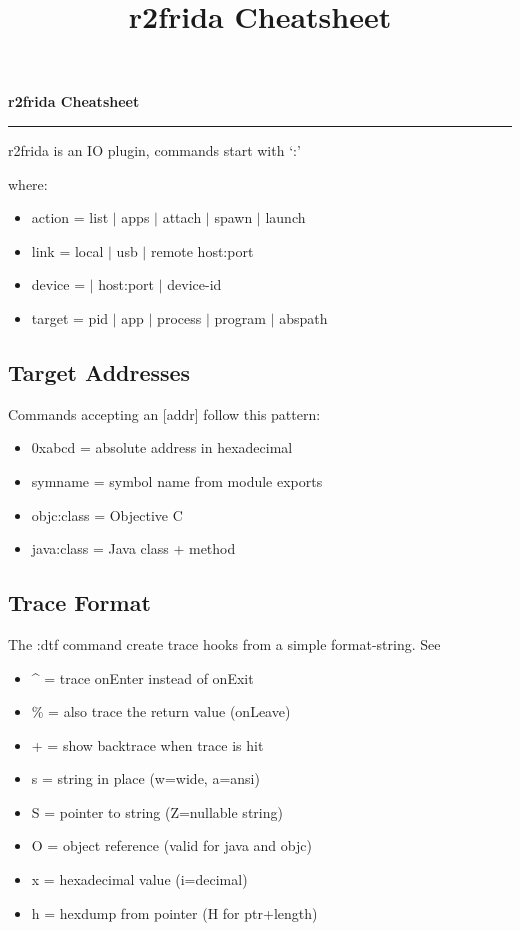 \documentclass[10pt]{article}
\title{r2frida Cheatsheet}
\begin{document}
\pagestyle{r2fancy}

\begin{center}
	\Large{\bf r2frida Cheatsheet}
	\rule{\textwidth}{0.2pt}
\end{center}

\begin{multicols}{3}
\noindent
r2frida is an IO plugin, commands start with `{\ttc:}'
\begin{center}
\end{center}
where:
\begin{itemize}
	\itemsep 0em %
	\item action = list $\vert$ apps $\vert$ attach $\vert$ spawn $\vert$ launch
	\item link   = local $\vert$ usb $\vert$ remote host:port
	\item device = {\tt \textquotesingle \textquotesingle} $\vert$ host:port $\vert$ device-id
	\item target = pid $\vert$ app $\vert$ process $\vert$ program $\vert$ abspath
\end{itemize}

\subsection*{Target Addresses}
\noindent
Commands accepting an [addr] follow this pattern:
\begin{itemize}
	\itemsep 0em %
	\item 0xabcd = absolute address in hexadecimal
	\item symname = symbol name from module exports
	\item objc:class = Objective C
	\item java:class = Java class + method
\end{itemize}

\subsection*{Trace Format}
\noindent
The :dtf command create trace hooks from a simple format-string. See 
\begin{itemize}
	\itemsep 0em %
	\item \^{} = trace onEnter instead of onExit
	\item \%{} = also trace the return value (onLeave)
	\item + = show backtrace when trace is hit
	\item s = string in place (w=wide, a=ansi)
	\item S = pointer to string (Z=nullable string)
	\item O = object reference (valid for java and objc)
	\item x = hexadecimal value (i=decimal)
	\item h = hexdump from pointer (H for ptr+length)
\end{itemize}


\end{multicols}
\end{document}

